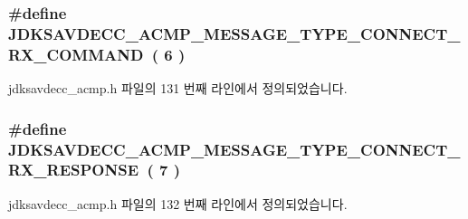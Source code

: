 \subsubsection[{\texorpdfstring{J\+D\+K\+S\+A\+V\+D\+E\+C\+C\+\_\+\+A\+C\+M\+P\+\_\+\+M\+E\+S\+S\+A\+G\+E\+\_\+\+T\+Y\+P\+E\+\_\+\+C\+O\+N\+N\+E\+C\+T\+\_\+\+R\+X\+\_\+\+C\+O\+M\+M\+A\+ND}{JDKSAVDECC_ACMP_MESSAGE_TYPE_CONNECT_RX_COMMAND}}]{\setlength{\rightskip}{0pt plus 5cm}\#define J\+D\+K\+S\+A\+V\+D\+E\+C\+C\+\_\+\+A\+C\+M\+P\+\_\+\+M\+E\+S\+S\+A\+G\+E\+\_\+\+T\+Y\+P\+E\+\_\+\+C\+O\+N\+N\+E\+C\+T\+\_\+\+R\+X\+\_\+\+C\+O\+M\+M\+A\+ND~( 6 )}\hypertarget{group__acmp__message__type_gaf72da38ed84005b55360db3bea1a2e5e}{}\label{group__acmp__message__type_gaf72da38ed84005b55360db3bea1a2e5e}


jdksavdecc\+\_\+acmp.\+h 파일의 131 번째 라인에서 정의되었습니다.

\subsubsection[{\texorpdfstring{J\+D\+K\+S\+A\+V\+D\+E\+C\+C\+\_\+\+A\+C\+M\+P\+\_\+\+M\+E\+S\+S\+A\+G\+E\+\_\+\+T\+Y\+P\+E\+\_\+\+C\+O\+N\+N\+E\+C\+T\+\_\+\+R\+X\+\_\+\+R\+E\+S\+P\+O\+N\+SE}{JDKSAVDECC_ACMP_MESSAGE_TYPE_CONNECT_RX_RESPONSE}}]{\setlength{\rightskip}{0pt plus 5cm}\#define J\+D\+K\+S\+A\+V\+D\+E\+C\+C\+\_\+\+A\+C\+M\+P\+\_\+\+M\+E\+S\+S\+A\+G\+E\+\_\+\+T\+Y\+P\+E\+\_\+\+C\+O\+N\+N\+E\+C\+T\+\_\+\+R\+X\+\_\+\+R\+E\+S\+P\+O\+N\+SE~( 7 )}\hypertarget{group__acmp__message__type_ga387118815f681eccff5e5b1a2025b1c4}{}\label{group__acmp__message__type_ga387118815f681eccff5e5b1a2025b1c4}


jdksavdecc\+\_\+acmp.\+h 파일의 132 번째 라인에서 정의되었습니다.

